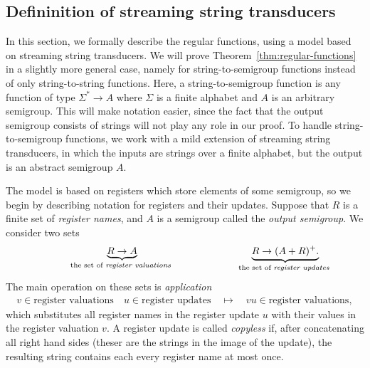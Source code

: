 \subsection{Defininition of streaming string transducers}
\label{sec:sst-definition}
In this section, we formally describe the regular functions, using a model based on  streaming string transducers.  We will prove Theorem~\ref{thm:regular-functions} in a slightly more general case, namely for string-to-semigroup functions instead of only string-to-string functions. Here, a string-to-semigroup function is any function of type $\Sigma^* \to A$ where $\Sigma$ is a finite alphabet and $A$ is an arbitrary semigroup.  This will make notation easier, since the fact that the output semigroup consists of strings will not play any role in our proof.
To handle string-to-semigroup functions, we work with a mild extension of streaming string transducers, in which the inputs are strings over a finite alphabet, but the output is an abstract semigroup $A$.   

The model is based on registers which store elements of some semigroup, so we begin by describing notation for registers and their updates. Suppose that $R$ is a finite set of \emph{register names}, and $A$ is a semigroup called the \emph{output semigroup}. We consider two sets 
\begin{align*}
\hspace{2cm}
    \myunderbrace{R \to A}{the set of \emph{register valuations}} 
    \hspace{4cm}
    \myunderbrace{R \to (A+R)^+.}{the set of \emph{register updates}}
\end{align*}
The main operation on these sets is \emph{application}
\begin{align*}
v \in \text{register valuations} \quad u \in \text{register updates} \quad \mapsto \quad vu \in \text{register valuations},
\end{align*}
which substitutes all register names in the register update $u$ with their values in the register valuation $v$. 
A register update is called \emph{copyless} if, after concatenating all right hand sides (theser are the strings in the image of the update), the resulting string contains each every register name at most once.


